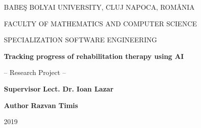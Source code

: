 \documentclass[runningheads,a4paper,11pt]{report}
\begin{document}
\begin{titlepage}
\sloppy
\begin{center}
BABE\c S BOLYAI UNIVERSITY, CLUJ NAPOCA, ROM\^ ANIA

FACULTY OF MATHEMATICS AND COMPUTER SCIENCE

SPECIALIZATION SOFTWARE ENGINEERING 

\vspace{5cm}

\Huge \textbf{Tracking progress of rehabilitation therapy using AI}

\vspace{1cm}

\normalsize -- Research Project --

\end{center}


\vspace{5cm}

\begin{flushleft}
\textbf{Supervisor} \break
\Large{\textbf{Lect. Dr. Ioan Lazar}}
\end{flushleft}

\begin{flushright}
\textbf{Author} \break
\Large{\textbf{Razvan Timis}}
\end{flushright}

\vspace{4cm}

\begin{center}
2019
\end{center}

\end{titlepage}


\renewcommand{\contentsname}{Table of Contents}
\tableofcontents



\newpage

\end{document}
